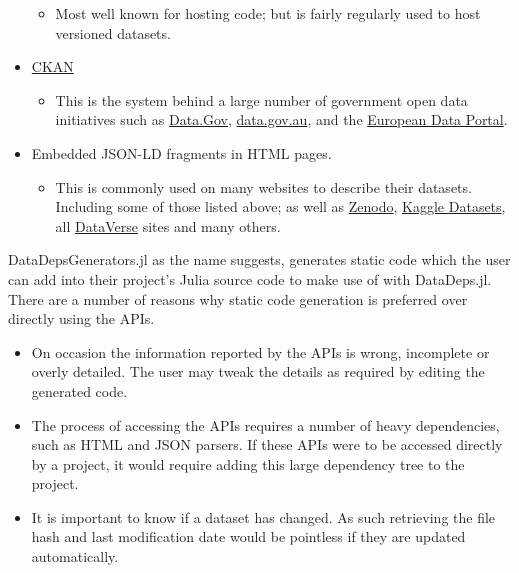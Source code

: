 \documentclass{book}
\begin{document}
\begin{itemize}
	\begin{itemize}
		\item
		Most well known for hosting code; but is fairly regularly used to
		host versioned datasets.
	\end{itemize}
	\item
	\href{http://ckan.org/}{CKAN}
	
	\begin{itemize}
		\item
		This is the system behind a large number of government open data
		initiatives such as \href{https://data.gov}{Data.Gov},
		\href{https://data.gov.au/}{data.gov.au}, and the
		\href{https://www.europeandataportal.eu/}{European Data Portal}.
	\end{itemize}
	\item
	Embedded JSON-LD fragments in HTML pages.
	
	\begin{itemize}
		\item
		This is commonly used on many websites to describe their datasets.
		Including some of those listed above; as well as
		\href{https://zenodo.org/}{Zenodo},
		\href{https://www.kaggle.com/datasets}{Kaggle Datasets}, all
		\href{https://dataverse.org/}{DataVerse} sites and many others.
	\end{itemize}
\end{itemize}

DataDepsGenerators.jl as the name suggests, generates static code which
the user can add into their project's Julia source code to make use of
with DataDeps.jl. There are a number of reasons why static code
generation is preferred over directly using the APIs.

\begin{itemize}
	\item
	On occasion the information reported by the APIs is wrong, incomplete
	or overly detailed. The user may tweak the details as required by
	editing the generated code.
	\item
	The process of accessing the APIs requires a number of heavy
	dependencies, such as HTML and JSON parsers. If these APIs were to be
	accessed directly by a project, it would require adding this large
	dependency tree to the project.
	\item
	It is important to know if a dataset has changed. As such retrieving
	the file hash and last modification date would be pointless if they
	are updated automatically.
\end{itemize}
\end{document}
